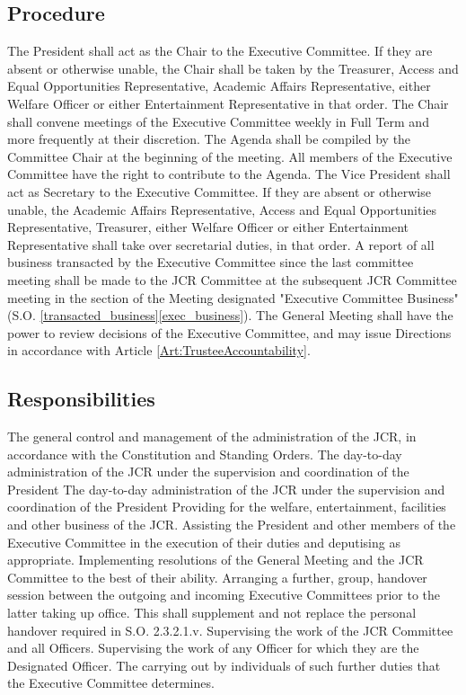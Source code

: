\subsection{Procedure}
\npara The President shall act as the Chair to the Executive Committee.
If they are absent or otherwise unable, the Chair shall be taken by the Treasurer, Access and Equal Opportunities Representative, Academic Affairs Representative, either Welfare Officer or either Entertainment Representative in that order.
\npara The Chair shall convene meetings of the Executive Committee weekly in Full Term and more frequently at their discretion.
\npara The Agenda shall be compiled by the Committee Chair at the beginning of the meeting.
All members of the Executive Committee have the right to contribute to the Agenda.
\npara The Vice President shall act as Secretary to the Executive Committee.
If they are absent or otherwise unable, the Academic Affairs Representative, Access and Equal Opportunities Representative, Treasurer, either Welfare Officer or either Entertainment Representative shall take over secretarial duties, in that order.
\npara A report of all business transacted by the Executive Committee since the last committee meeting shall be made to the JCR Committee at the subsequent JCR Committee meeting in the section of the Meeting designated "Executive Committee Business" (S.O. \ref{transacted_business}\ref{exec_business}).
\npara The General Meeting shall have the power to review decisions of the Executive Committee, and may issue Directions in accordance with Article \ref{Art:TrusteeAccountability}.
\subsection{Responsibilities}
\npara The general control and management of the administration of the JCR, in accordance with the Constitution and Standing Orders.
\npara The day-to-day administration of the JCR under the supervision and coordination of the President
\npara The day-to-day administration of the JCR under the supervision and coordination of the President
\npara Providing for the welfare, entertainment, facilities and other business of the JCR.
\npara Assisting the President and other members of the Executive Committee in the execution of their duties and deputising as appropriate.
\npara Implementing resolutions of the General Meeting and the JCR Committee to the best of their ability.
\npara Arranging a further, group, handover session between the outgoing and incoming Executive Committees prior to the latter taking up office. This shall supplement and not replace the personal handover required in S.O. 2.3.2.1.v.
\npara Supervising the work of the JCR Committee and all Officers.
\npara Supervising the work of any Officer for which they are the Designated Officer.
\npara The carrying out by individuals of such further duties that the Executive Committee determines.
